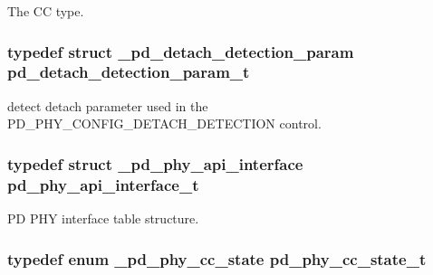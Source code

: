 The C\-C type. 

\hypertarget{group__usb__pd__phy__drv_ga658add3c5d8eb8ab53366b4850863a60}{
\subsubsection[{pd\-\_\-detach\-\_\-detection\-\_\-param\-\_\-t}]{\setlength{\rightskip}{0pt plus 5cm}typedef struct {\bf \-\_\-pd\-\_\-detach\-\_\-detection\-\_\-param}  {\bf pd\-\_\-detach\-\_\-detection\-\_\-param\-\_\-t}}}\label{group__usb__pd__phy__drv_ga658add3c5d8eb8ab53366b4850863a60}


detect detach parameter used in the P\-D\-\_\-\-P\-H\-Y\-\_\-\-C\-O\-N\-F\-I\-G\-\_\-\-D\-E\-T\-A\-C\-H\-\_\-\-D\-E\-T\-E\-C\-T\-I\-O\-N control. 

\hypertarget{group__usb__pd__phy__drv_ga9494f6971e6132cb70c98b92f45af74f}{
\subsubsection[{pd\-\_\-phy\-\_\-api\-\_\-interface\-\_\-t}]{\setlength{\rightskip}{0pt plus 5cm}typedef struct {\bf \-\_\-pd\-\_\-phy\-\_\-api\-\_\-interface}  {\bf pd\-\_\-phy\-\_\-api\-\_\-interface\-\_\-t}}}\label{group__usb__pd__phy__drv_ga9494f6971e6132cb70c98b92f45af74f}


P\-D P\-H\-Y interface table structure. 

\hypertarget{group__usb__pd__phy__drv_ga33106675227396a51d78ea6a7f562570}{
\subsubsection[{pd\-\_\-phy\-\_\-cc\-\_\-state\-\_\-t}]{\setlength{\rightskip}{0pt plus 5cm}typedef enum {\bf \-\_\-pd\-\_\-phy\-\_\-cc\-\_\-state}  {\bf pd\-\_\-phy\-\_\-cc\-\_\-state\-\_\-t}}}\label{group__usb__pd__phy__drv_ga33106675227396a51d78ea6a7f562570}


